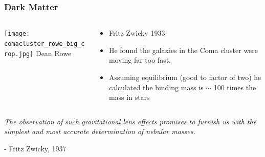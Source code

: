 \documentclass{beamer}
\begin{document}
\frame
{
    \frametitle{Dark Matter}

    \begin{columns}

        \begin{column}{0.5\textwidth}
            \begin{center}
                \texttt{[image: comacluster\_rowe\_big\_crop.jpg]}
                \newline
                {\tiny Dean Rowe}
            \end{center}
        \end{column}



        \begin{column}{0.5\textwidth}    
            \begin{itemize}

                \item Fritz Zwicky 1933

                \item He found the galaxies in the Coma cluster were moving far
                    too fast.

                \item Assuming equilibrium (good to factor of two) he calculated
                    the binding mass is $\sim$ 100 times the mass in stars

            \end{itemize}
        \end{column}

    \end{columns}
}

\frame
{

    {\Large 
        {\em The observation of such gravitational lens effects promises to furnish us with
        the simplest and most accurate determination of nebular masses.}
        \newline

        \hfill - Fritz Zwicky, 1937
    }
}
\end{document}
